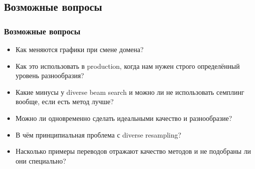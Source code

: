 \documentclass[unicode]{beamer}
\begin{document}
\subsection{Возможные вопросы}
\begin{frame}
\frametitle{Возможные вопросы}
\begin{itemize}
    \item Как меняются графики при смене домена? \newline
    \item Как это использовать в production, когда нам нужен строго определённый уровень разнообразия? \newline
    \item Какие минусы у diverse beam search и можно ли не использовать семплинг вообще, если есть метод лучше? \newline
    \item Можно ли одновременно сделать идеальными качество и разнообразие? \newline
    \item В чём принципиальная проблема с diverse resampling? \newline
    \item Насколько примеры переводов отражают качество методов и не подобраны ли они специально?
\end{itemize}
\end{frame}
\end{document}
